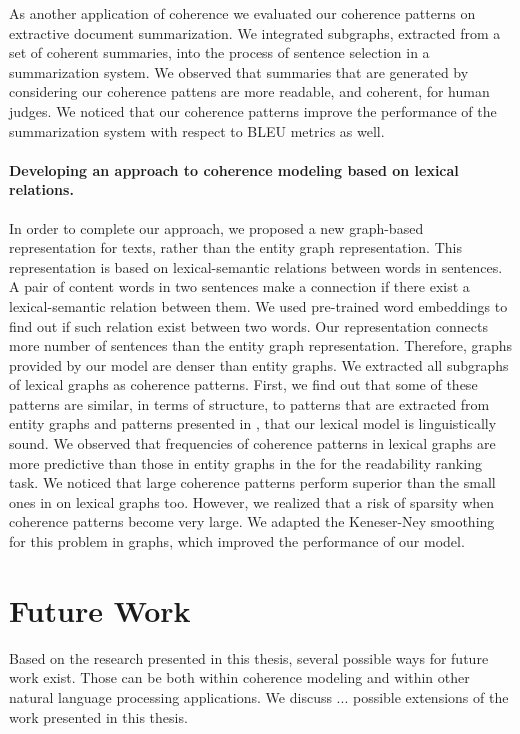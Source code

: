 As another application of coherence we evaluated our coherence patterns on extractive document summarization. 
We integrated subgraphs, extracted from a set of coherent summaries, into the process of sentence selection in a summarization system. 
We observed that summaries that are generated by considering our coherence pattens are more readable, and coherent, for human judges. 
We noticed that our coherence patterns improve the performance of the summarization system with respect to BLEU metrics as well. 

\paragraph{Developing an approach to coherence modeling based on lexical relations.} 
In order to complete our approach, we proposed a new graph-based representation for texts, rather than the entity graph representation.  
This representation is based on lexical-semantic relations between words in sentences.
A pair of content words in two sentences make a connection if there exist a lexical-semantic relation between them. 
We used pre-trained word embeddings to find out if such relation exist between two words. 
Our representation connects more number of sentences than the entity graph representation. 
Therefore, graphs provided by our model are denser than entity graphs. 
We extracted all subgraphs of lexical graphs as coherence patterns. 
First, we find out that some of these patterns are similar, in terms of structure, to patterns that are extracted from entity graphs and patterns presented in , that our lexical model is linguistically sound. 
We observed that frequencies of coherence patterns in lexical graphs are more predictive than those in entity graphs in the for the readability ranking task. 
We noticed that large coherence patterns perform superior than the small ones in on lexical graphs too. 
However, we realized that a risk of sparsity when coherence patterns become very large. 
We adapted the Keneser-Ney smoothing for this problem in graphs, which improved the performance of our model. 

\section{Future Work}
\label{sec:conc-future_work}

Based on the research presented in this thesis, several possible ways for future work exist. 
Those can be both within coherence modeling and within other natural language processing applications.  
We discuss ... possible extensions of the work presented in this thesis. 

